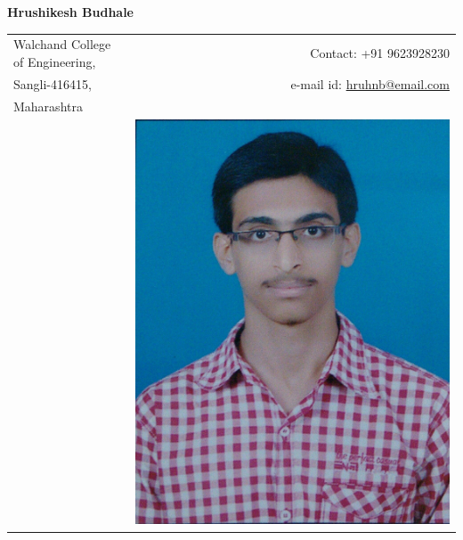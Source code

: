 \documentclass[a4paper,11pt,oneside]{article}
\begin{document}
\noindent\LARGE{\textbf{ Hrushikesh Budhale}}  \\
\vspace{0ex}
\noindent\hrulefill
\normalsize


\begin{center}
\vspace{-3ex}
\begin{tabular}{l r}
 Walchand College of Engineering,    & \hspace{2.5in} Contact: +91 9623928230\\
 Sangli-416415,                      & \hspace{2.5in} e-mail id: \href{mailto:hruhnb@email.com}{hruhnb@email.com} \\
 Maharashtra                         & \\
                                     & \hspace{2.5in} \includegraphics[scale=0.04]{id.jpg} \\
\end{tabular}
\end{center}
\end{document}
